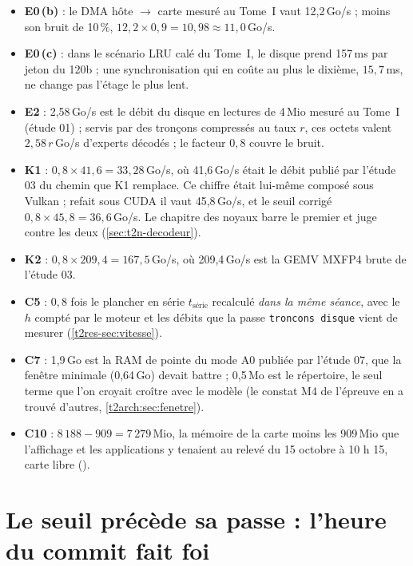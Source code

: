 \begin{itemize}
\item \textbf{E0\,(b)} : le DMA hôte $\to$ carte mesuré au Tome~I vaut 12,2\,Go/s ; moins son bruit de 10\,\%, $12{,}2 \times 0{,}9 = 10{,}98 \approx 11{,}0$\,Go/s.
\item \textbf{E0\,(c)} : dans le scénario LRU calé du Tome~I, le disque prend 157\,ms par jeton du 120b ; une synchronisation qui en coûte au plus le dixième, $15{,}7$\,ms, ne change pas l'étage le plus lent.
\item \textbf{E2} : 2,58\,Go/s est le débit du disque en lectures de 4\,Mio mesuré au Tome~I (étude 01) ; servis par des tronçons compressés au taux $r$, ces octets valent $2{,}58\,r$\,Go/s d'experts décodés ; le facteur $0{,}8$ couvre le bruit.
\item \textbf{K1} : $0{,}8 \times 41{,}6 = 33{,}28$\,Go/s, où 41,6\,Go/s était le débit publié par l'étude 03 du chemin que K1 remplace. Ce chiffre était lui-même composé sous Vulkan ; refait sous CUDA il vaut 45,8\,Go/s, et le seuil corrigé $0{,}8 \times 45{,}8 = 36{,}6$\,Go/s. Le chapitre des noyaux barre le premier et juge contre les deux (\cref{sec:t2n-decodeur}).
\item \textbf{K2} : $0{,}8 \times 209{,}4 = 167{,}5$\,Go/s, où 209,4\,Go/s est la GEMV MXFP4 brute de l'étude 03.
\item \textbf{C5} : $0{,}8$ fois le plancher en série $t_{\text{série}}$ recalculé \emph{dans la même séance}, avec le $h$ compté par le moteur et les débits que la passe \texttt{troncons disque} vient de mesurer (\cref{t2res-sec:vitesse}).
\item \textbf{C7} : 1,9\,Go est la RAM de pointe du mode A0 publiée par l'étude 07, que la fenêtre minimale (0,64\,Go) devait battre ; 0,5\,Mo est le répertoire, le seul terme que l'on croyait croître avec le modèle (le constat M4 de l'épreuve en a trouvé d'autres, \cref{t2arch:sec:fenetre}).
\item \textbf{C10} : $8\,188 - 909 = 7\,279$\,Mio, la mémoire de la carte moins les 909\,Mio que l'affichage et les applications y tenaient au relevé du 15 octobre à 10 h 15, carte libre ().
\end{itemize}

\section{Le seuil précède sa passe : l'heure du commit fait foi}\label{t2ann:sec:heure}

